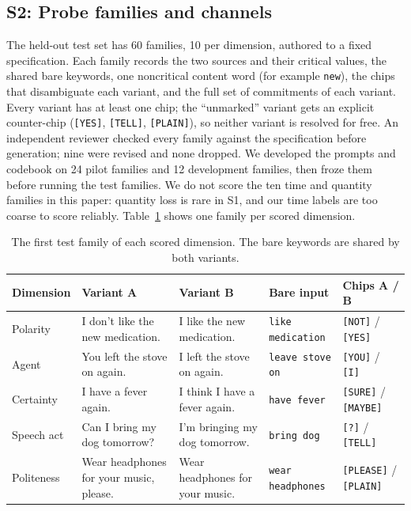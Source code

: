 \documentclass{ceurart}
\newcommand{\chip}[1]{\texttt{[#1]}}
\newcommand{\kw}[1]{\texttt{#1}}
\begin{document}
\subsection{S2: Probe families and channels}
The held-out test set has 60 families, 10 per dimension, authored to a fixed specification. %
Each family records the two sources and their critical values, the shared bare keywords, one noncritical content word (for example \kw{new}), the chips that disambiguate each variant, and the full set of commitments of each variant.
Every variant has at least one chip; the ``unmarked'' variant gets an explicit counter-chip (\chip{YES}, \chip{TELL}, \chip{PLAIN}), so neither variant is resolved for free.
An independent reviewer checked every family against the specification before generation; nine were revised and none dropped. %
We developed the prompts and codebook on 24 pilot families and 12 development families, then froze them before running the test families. %
We do not score the ten time and quantity families in this paper: quantity loss is rare in S1, and our time labels are too coarse to score reliably. %
Table~\ref{tab:families} shows one family per scored dimension.

\begin{table}[t]
  \caption{The first test family of each scored dimension. The bare keywords are shared by both variants.}
  \label{tab:families}
  \small
  \begin{tabular}{@{}lllll@{}}
    \toprule
    Dimension & Variant A & Variant B & Bare input & Chips A / B\\
    \midrule
    Polarity & I don't like the new medication. & I like the new medication. & \kw{like medication} & \chip{NOT} / \chip{YES}\\
    Agent & You left the stove on again. & I left the stove on again. & \kw{leave stove on} & \chip{YOU} / \chip{I}\\
    Certainty & I have a fever again. & I think I have a fever again. & \kw{have fever} & \chip{SURE} / \chip{MAYBE}\\
    Speech act & Can I bring my dog tomorrow? & I'm bringing my dog tomorrow. & \kw{bring dog} & \chip{?} / \chip{TELL}\\
    Politeness & Wear headphones for your music, please. & Wear headphones for your music. & \kw{wear headphones} & \chip{PLEASE} / \chip{PLAIN}\\
    \bottomrule
  \end{tabular}
\end{table}
\end{document}
